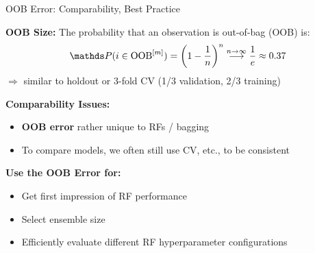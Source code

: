 \documentclass[11pt,compress,t,notes=noshow,xcolor=table]{beamer}
\begin{document}
\begin{vbframe}{OOB Error: Comparability, Best Practice}

\textbf{OOB Size:} The probability that an observation is out-of-bag (OOB) is:
$$\P(i \in \text{OOB}^{[m]}) = \left(1 - \frac{1}{n}\right)^n \stackrel{n \to \infty}{\longrightarrow} \frac{1}{e} \approx 0.37$$
$\Rightarrow$ similar to holdout or 3-fold CV (1/3 validation, 2/3 training)

\textbf{Comparability Issues:}
\begin{itemize}
\item \textbf{OOB error} rather unique to RFs / bagging
\item To compare models, we often still use CV, etc., to be consistent
\end{itemize}

\textbf{Use the OOB Error for:}
\begin{itemize}
  \item Get first impression of RF performance
  \item Select ensemble size
\item Efficiently evaluate different RF hyperparameter configurations
\end{itemize}


\end{vbframe}

\endlecture
\end{document}
